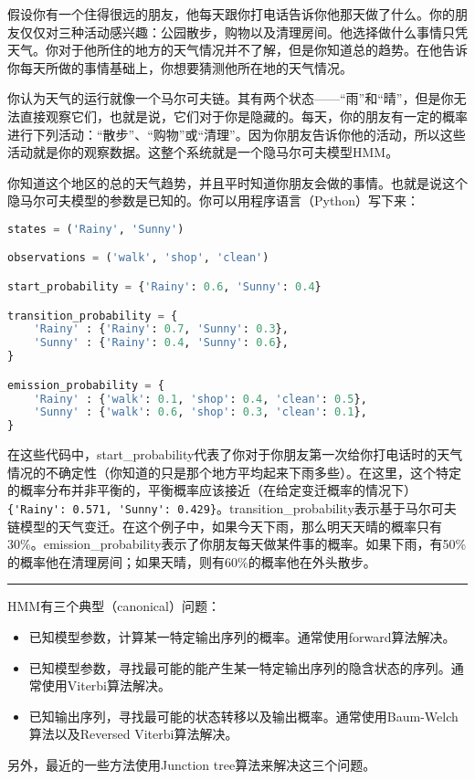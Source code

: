 \documentclass[11pt,a4paper,twoside]{book}
\begin{document}
{\small
假设你有一个住得很远的朋友，他每天跟你打电话告诉你他那天做了什么。你的朋友仅仅对三种活动感兴趣：公园散步，购物以及清理房间。他选择做什么事情只凭天气。你对于他所住的地方的天气情况并不了解，但是你知道总的趋势。在他告诉你每天所做的事情基础上，你想要猜测他所在地的天气情况。

你认为天气的运行就像一个马尔可夫链。其有两个状态——“雨”和“晴”，但是你无法直接观察它们，也就是说，它们对于你是隐藏的。每天，你的朋友有一定的概率进行下列活动：“散步”、“购物”或“清理”。因为你朋友告诉你他的活动，所以这些活动就是你的观察数据。这整个系统就是一个隐马尔可夫模型HMM。

你知道这个地区的总的天气趋势，并且平时知道你朋友会做的事情。也就是说这个隐马尔可夫模型的参数是已知的。你可以用程序语言（Python）写下来：

\begin{lstlisting}[language=python]
states = ('Rainy', 'Sunny')

observations = ('walk', 'shop', 'clean')

start_probability = {'Rainy': 0.6, 'Sunny': 0.4}

transition_probability = {
    'Rainy' : {'Rainy': 0.7, 'Sunny': 0.3},
    'Sunny' : {'Rainy': 0.4, 'Sunny': 0.6},
}

emission_probability = {
    'Rainy' : {'walk': 0.1, 'shop': 0.4, 'clean': 0.5},
    'Sunny' : {'walk': 0.6, 'shop': 0.3, 'clean': 0.1},
}
\end{lstlisting}

在这些代码中，start\_probability代表了你对于你朋友第一次给你打电话时的天气情况的不确定性（你知道的只是那个地方平均起来下雨多些）。在这里，这个特定的概率分布并非平衡的，平衡概率应该接近（在给定变迁概率的情况下）\verb|{'Rainy': 0.571, 'Sunny': 0.429}|。transition\_probability表示基于马尔可夫链模型的天气变迁。在这个例子中，如果今天下雨，那么明天天晴的概率只有30\%。emission\_probability表示了你朋友每天做某件事的概率。如果下雨，有50\%的概率他在清理房间；如果天晴，则有60\%的概率他在外头散步。
}

\hrule height 3pt
\vspace{0.5cm}

HMM有三个典型（canonical）问题：
\begin{itemize}
  \item 已知模型参数，计算某一特定输出序列的概率。通常使用forward算法解决。
  \item 已知模型参数，寻找最可能的能产生某一特定输出序列的隐含状态的序列。通常使用Viterbi算法解决。
  \item 已知输出序列，寻找最可能的状态转移以及输出概率。通常使用Baum-Welch算法以及Reversed Viterbi算法解决。 \end{itemize}
另外，最近的一些方法使用Junction tree算法来解决这三个问题。
\end{document}
